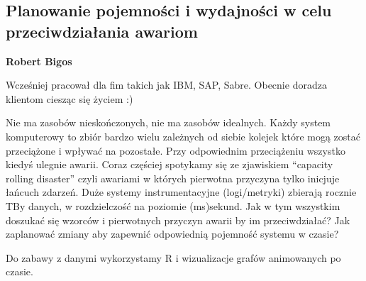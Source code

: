 \documentclass[\main/boa.tex]{subfiles}
\begin{document}
\subsection{Planowanie pojemności i wydajności w celu przeciwdziałania awariom}

\begin{minipage}{0.915\textwidth}
	\centering
  {\bf {} Robert Bigos}
\end{minipage}

\vskip 0.3cm

\begin{affiliations}
\begin{minipage}{0.915\textwidth}
\centering
Wcześniej pracował dla fim takich jak IBM, SAP, Sabre. Obecnie doradza klientom ciesząc się życiem :)  \\[-2pt]
\end{minipage}
\end{affiliations}

\vskip 0.8cm

 Nie ma zasobów nieskończonych, nie ma zasobów idealnych. Każdy system komputerowy to zbiór bardzo wielu zależnych od siebie kolejek które mogą zostać przeciążone i wpływać na pozostałe. Przy odpowiednim przeciążeniu wszystko kiedyś ulegnie awarii. Coraz częściej spotykamy się ze zjawiskiem “capacity rolling disaster” czyli awariami w których pierwotna przyczyna tylko inicjuje łańcuch zdarzeń. Duże systemy instrumentacyjne (logi/metryki) zbierają rocznie TBy danych, w rozdzielczość na poziomie (ms)sekund. Jak w tym wszystkim doszukać się wzorców i pierwotnych przyczyn awarii by im przeciwdziałać? Jak zaplanować zmiany aby zapewnić odpowiednią pojemność systemu w czasie?
 
 Do zabawy z danymi wykorzystamy R i wizualizacje grafów animowanych po czasie.
 
\end{document}
